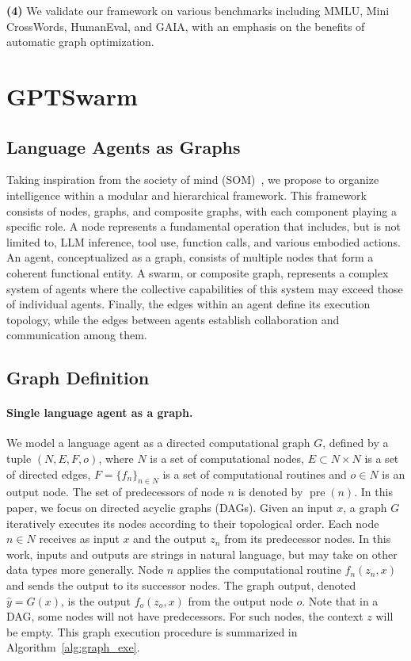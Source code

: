\documentclass{article}
\DeclareMathOperator{\pre}{pre}
\theoremstyle{plain}
\theoremstyle{definition}
\theoremstyle{remark}
\begin{document}
\noindent \textbf{(4)} We validate our framework on various benchmarks including MMLU, Mini CrossWords, HumanEval, and GAIA,  with an emphasis on the benefits of automatic graph optimization.


\section{GPTSwarm}

\subsection{Language Agents as Graphs}

Taking inspiration from the society of mind (SOM)~\citep{minsky1988society, zhuge2023mindstorms}, we propose to organize intelligence within a modular and hierarchical framework.
This framework consists of nodes, graphs, and composite graphs, with each component playing a specific role.
A node represents a fundamental operation that includes, but is not limited to, LLM inference, tool use, function calls, and various embodied actions.
An agent, conceptualized as a graph, consists of multiple nodes that form a coherent functional entity.
A swarm, or composite graph, represents a complex system of agents where the collective capabilities of this system may exceed those of individual agents. 
Finally, the edges within an agent define its execution topology, while the edges between agents establish collaboration and communication among them.

\subsection{Graph Definition}

\paragraph{Single language agent as a graph.} We model a language agent as a directed computational graph $G$, defined by a tuple $(N, E, F, o)$, where $N$ is a set of computational nodes, $E \subset N \times N$ is a set of directed edges, $F = \{f_n\}_{n\in N}$ is a set of computational routines and $o \in N$ is an output node.
The set of predecessors of node $n$ is denoted by $\pre(n)$.
In this paper, we focus on directed acyclic graphs (DAGs). 
Given an input $x$, a graph $G$ iteratively executes its nodes according to their topological order. 
Each node $n \in N$ receives as input $x$ and the output $z_n$ from its predecessor nodes.
In this work, inputs and outputs are strings in natural language, but may take on other data types more generally.
Node $n$ applies the computational routine $f_n (z_n, x)$ and sends the output to its successor nodes.
The graph output, denoted $\hat{y} = G(x)$, is the output $f_o (z_o, x)$ from the output node $o$.
Note that in a DAG, some nodes will not have predecessors.
For such nodes, the context $z$ will be empty.
This graph execution procedure is summarized in Algorithm~\ref{alg:graph_exe}.
\end{document}
